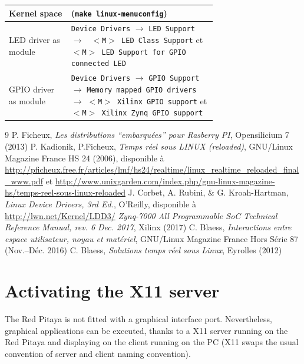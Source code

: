 \documentclass{article}
\begin{document}
{{\begin{tabular}{l|p{0.70\linewidth}}\hline
Kernel space &({\tt make linux-menuconfig}) \\\hline\hline
LED driver as module & {\tt Device Drivers} $\rightarrow$ {\tt LED Support} $\rightarrow$ {\tt
$<$M$>$ LED Class Support} et {\tt $<$M$>$ LED Support for GPIO connected LED}\\ 
GPIO driver as module & {\tt Device Drivers} $\rightarrow$ {\tt GPIO Support} $\rightarrow$ 
{\tt Memory mapped GPIO drivers} $\rightarrow$ {\tt $<$M$>$ Xilinx GPIO support} et {\tt $<$M$>$ 
Xilinx Zynq GPIO support}\\
\end{tabular}

\begin{thebibliography}{9}
 P. Ficheux, {\em Les distributions ``embarqu\'ees'' pour Rasberry PI}, 
Opensilicium 7 (2013)
 P. Kadionik, P.Ficheux, {\em Temps r\'eel sous LINUX (reloaded)},
GNU/Linux Magazine France HS 24 (2006), disponible \`a 
\url{http://pficheux.free.fr/articles/lmf/hs24/realtime/linux_realtime_reloaded_final_www.pdf}
et \url{http://www.unixgarden.com/index.php/gnu-linux-magazine-hs/temps-reel-sous-linux-reloaded}
 J. Corbet, A. Rubini, \& G. Kroah-Hartman, {\em Linux Device Drivers, 3rd Ed.},
O'Reilly, disponible \`a \url{http://lwn.net/Kernel/LDD3/}
 {\em Zynq-7000 All Programmable SoC Technical Reference Manual, rev. 6 Dec. 2017}, Xilinx (2017)
 C. Blaess, {\em Interactions entre espace utilisateur, noyau et mat\'eriel}, GNU/Linux
Magazine France Hors S\'erie 87 (Nov.--D\'ec. 2016) 
 C. Blaess, {\em Solutions temps r\'eel sous Linux}, Eyrolles (2012)
\end{thebibliography}

\appendix
\section*{Activating the X11 server}\label{VGA}

The Red Pitaya is not fitted with a graphical interface port. Nevertheless,
graphical applications can be executed, thanks to a X11 server running on the
Red Pitaya and displaying on the client running on the PC (X11 swaps the usual
convention of server and client naming convention).

}}
\end{document}
